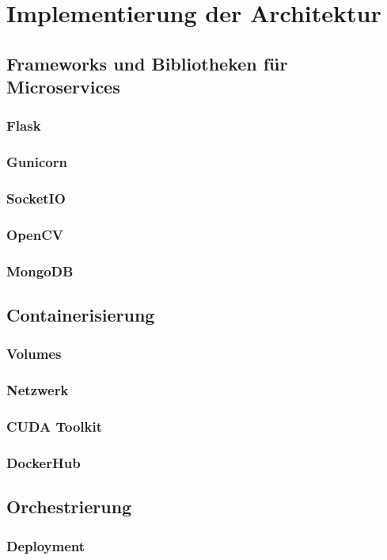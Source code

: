 \chapter{Implementierung der Architektur}


\section{Frameworks und Bibliotheken für Microservices}

\subsection{Flask}
\subsection{Gunicorn}
\subsection{SocketIO}
\subsection{OpenCV}
\subsection{MongoDB}

\section{Containerisierung}
\subsection{Volumes}
\subsection{Netzwerk}
\subsection{CUDA Toolkit}
\subsection{DockerHub}

\section{Orchestrierung}
\subsection{Deployment}
